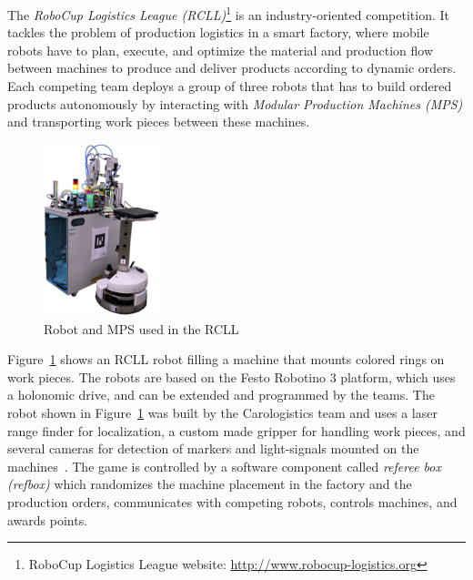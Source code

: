 \documentclass[a4paper,11pt]{article}
\newcommand{\reffig}[1]{Figure~\ref{#1}}
\begin{document}
The \emph{RoboCup Logistics League (RCLL)}\footnote{RoboCup Logistics
  League website: \url{http://www.robocup-logistics.org}}
is an industry-oriented competition.  It tackles
the problem of production logistics in a smart factory, where mobile
robots have to plan, execute, and optimize the material and production
flow between machines to produce and deliver products according to
dynamic orders. Each competing team deploys a group of three robots
that has to build ordered products autonomously by interacting with
\emph{Modular Production Machines (MPS)} and transporting work pieces
between these machines.
\begin{figure}
  \centering
  \vspace{-2.7ex}
  \includegraphics[width=0.3\textwidth]{img/rcll}
  \vspace{-4ex}
  \caption{Robot and MPS used in the RCLL~\cite{chapter-cps}}
  \label{fig:rcll}
\end{figure}
\reffig{fig:rcll} shows an RCLL robot filling
a machine that mounts colored rings on work pieces. The robots are
based on the Festo Robotino 3 platform, which uses a holonomic drive,
and can be extended and programmed by the teams. The robot shown in
\reffig{fig:rcll} was built by the Carologistics team and uses a
laser range finder for localization, a custom made gripper for
handling work pieces, and several cameras for detection of markers and
light-signals mounted on the machines~\cite{Carologistics2015,chapter-cps}. The
game is controlled by a software component called \emph{referee box
  (refbox)} which randomizes the machine placement in the factory and
the production orders, communicates with competing robots,
controls machines, and awards points.
\end{document}
